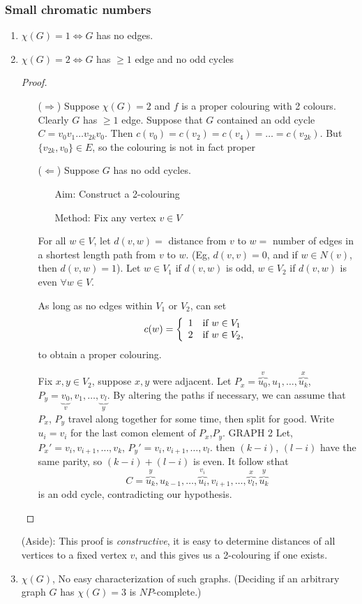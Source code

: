 \documentclass{article}
\begin{document}
\subsubsection*{Small chromatic numbers}
\begin{enumerate}
\item $\chi(G)=1 \iff G$ has no edges.
\item $\chi(G)=2 \iff G$ has $\geq 1$ edge and no odd cycles


\begin{proof}
\begin{itemize}
 \item[($\Rightarrow$)] Suppose $\chi(G)=2$ and $f$ is a proper colouring with 2 colours.  Clearly $G$ has $\geq 1$ edge.  Suppose that $G$ contained an odd cycle $C=v_0 v_1 \ldots v_{2k}v_0$.  Then $c(v_0) = c(v_2) = c(v_4)=\ldots=c(v_{2k})$.  But $\{v_{2k},v_0\} \in E$, so the colouring is not in fact proper
\item[($\Leftarrow$)] Suppose $G$ has no odd cycles. 
\begin{itemize}
 \item[Aim:]  Construct a 2-colouring
\item[Method:] Fix any vertex $v \in V$
\end{itemize}
For all $w \in V$, let $d(v,w)=$ distance from $v$ to $w=$ number of edges in a shortest length path from $v$ to $w$. (Eg, $d(v,v)=0$, and if $w \in N(v)$, then $d(v,w)=1$).  Let $w \in V_1$ if $d(v,w)$ is odd, $w \in V_2$ if $d(v,w)$ is even $\forall w \in V$.

As long as no edges within $V_1$ or $V_2$, can set \[c(w) = \left\{\begin{array}{l l}
                                                                    1 & \textmd{if } w \in V_1 \\
2 & \textmd{if } w \in V_2,
                                                                   \end{array}
\right.\]
to obtain a proper colouring.

Fix $x,y \in V_2 $, suppose $x,y$ were adjacent. Let $P_x = \overbrace{u_0}^v, u_1, \ldots, \overbrace{u_k}^x$, $P_y = \underbrace{v_0}_v, v_1, \ldots, \underbrace{v_l}_y$.  By altering the paths if necessary, we can assume that $P_x$, $P_y$ travel along together for some time, then split for good.  Write $u_i = v_i$ for the last comon element of $P_x$,$P_y$.
GRAPH 2
Let, $P_x' = v_i, v_{i+1}, \ldots, v_k$, $P_y' = v_i, v_{i+1}, \ldots, v_l$.  then $(k-i)$, $(l-i)$ have the same parity, so $(k-i) + (l-i)$ is even.  It follow sthat \[C=\overbrace{u_k}^y, u_{k-1}, \ldots, \overbrace{u_i}^{v_i}, v_{i+1}, \ldots, \overbrace{v_l}^x, \overbrace{u_k}^y\] is an odd cycle, contradicting our hypothesis.
\end{itemize}
\end{proof}

(Aside): This proof is \emph{constructive}, it is easy to determine distances of all vertices to a fixed vertex $v$, and this gives us a 2-colouring if one exists.
\item $\chi(G)$, No easy characterization of such graphs. (Deciding if an arbitrary graph $G$ has $\chi(G) = 3$ is $NP$-complete.)
\end{enumerate}
\end{document}
